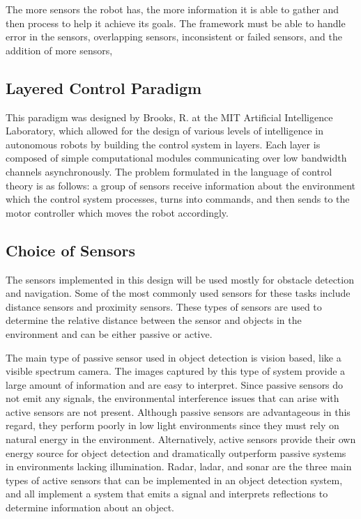 The more sensors the robot has, the more information it is able to gather and then process to help it achieve its goals. The framework must be able to handle error in the sensors, overlapping sensors, inconsistent or failed sensors, and the addition of more sensors, 

\subsection*{Layered Control Paradigm \cite{Brooks:1985}}
This paradigm was designed by Brooks, R. at the MIT Artificial Intelligence Laboratory, which allowed for the design of various levels of intelligence in autonomous robots by building the control system in layers. Each layer is composed of simple computational modules communicating over low bandwidth channels asynchronously. The problem formulated in the language of control theory is as follows: a group of sensors receive information about the environment which the control system processes, turns into commands, and then sends to the motor controller which moves the robot accordingly.

\subsection*{Choice of Sensors}
The sensors implemented in this design will be used mostly for obstacle detection and navigation.  Some of the most commonly used sensors for these tasks include distance sensors and proximity sensors.  These types of sensors are used to determine the relative distance between the sensor and objects in the environment and can be either passive or active. 

The main type of passive sensor used in object detection is vision based, like a visible spectrum camera.  The images captured by this type of system provide a large amount of information and are easy to interpret. Since passive sensors do not emit any signals, the environmental interference issues that can arise with active sensors are not present.  Although passive sensors are advantageous in this regard, they perform poorly in low light environments since they must rely on natural energy in the environment.  Alternatively, active sensors provide their own energy source for object detection and dramatically outperform passive systems in environments lacking illumination.  Radar, ladar, and sonar are the three main types of active sensors that can be implemented in an object detection system, and all implement a system that emits a signal and interprets reflections to determine information about an object.  \cite{Discant}

